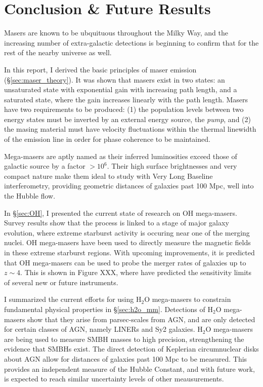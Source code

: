 \section{Conclusion \& Future Results}
\label{sec:conclusion}

Masers are known to be ubquituous throughout the Milky Way, and the increasing number of extra-galactic detections is beginning to confirm that for the rest of the nearby universe as well. 

In this report, I derived the basic principles of maser emission (\S\ref{sec:maser_theory}). It was shown that masers exist in two states: an unsaturated state with exponential gain with increasing path length, and a saturated state, where the gain increases linearly with the path length. Masers have two requirements to be produced: (1) the population levels between two energy states must be inverted by an external energy source, the {\it pump}, and (2) the masing material must have velocity fluctuations within the thermal linewidth of the emission line in order for phase coherence to be maintained.

Mega-masers are aptly named as their inferred luminosities exceed those of galactic source by a factor $\gt 10^6$. Their high surface brightnesses and very compact nature make them ideal to study with Very Long Baseline interferometry, providing geometric distances of galaxies past 100 Mpc, well into the Hubble flow.

In  \S\ref{sec:OH}, I presented the current state of research on OH mega-masers. Survey results show that the process is linked to a stage of major galaxy evolution, where extreme starburst activity is occuring near one of the merging nuclei. OH mega-masers have been used to directly measure the magnetic fields in these extreme starburst regions. With upcoming improvements, it is predicted that OH mega-masers can be used to probe the merger rates of galaxies up to $z\sim4$. This is shown in Figure XXX, where \citet{darling2002_lumfunc} have predicted the sensitivity limits of several new or future instruments. 

I summarized the current efforts for using H$_2$O mega-masers to constrain fundamental physical properties in \S\ref{sec:h2o_mm}. Detections of H$_2$O mega-masers show that they arise from parsec-scales from AGN, and are only detected for certain classes of AGN, namely LINERs and Sy2 galaxies. H$_2$O mega-masers are being used to measure SMBH masses to high precision, strengthening the evidence that SMBHs exist. The direct detection of Keplerian circumnuclear disks about AGN allow for distances of galaxies past 100 Mpc to be measured. This provides an independent measure of the Hubble Constant, and with future work, is expected to reach similar uncertainty levels of other meausurements.

